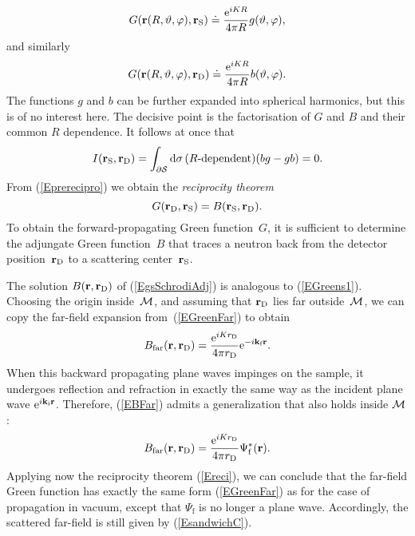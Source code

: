 \begin{equation}
   G(\mathbf{r}(R,\vartheta,\varphi),\mathbf{r}_\text{S})
   \doteq \frac{{\rm e}^{iKR}}{4\pi R} g(\vartheta,\varphi),
\end{equation}
and similarly 
\begin{equation}
   G(\mathbf{r}(R,\vartheta,\varphi),\mathbf{r}_\text{D})
   \doteq \frac{{\rm e}^{iKR}}{4\pi R} b(\vartheta,\varphi).
\end{equation}
The functions $g$ and $b$ can be further expanded into spherical harmonics,
but this is of no interest here.
The decisive point is the factorisation of $G$ and $B$
and their common $R$ dependence.
It follows at once that
\begin{equation}
  I(\mathbf{r}_\text{S},\mathbf{r}_\text{D})
  =\displaystyle\int_{\partial\mathcal{S}}{\rm d}\sigma\,
       (\text{$R$-dependent})(bg-gb)
  = 0.
\end{equation}
From (\ref{Eprerecipro}) we obtain the \textit{reciprocity theorem}
\begin{equation}\label{Ereci}
  G(\mathbf{r}_\text{D},\mathbf{r}_\text{S}) = B(\mathbf{r}_\text{S},\mathbf{r}_\text{D}).
\end{equation}
To obtain the forward-propagating Green function~$G$,
it is sufficient to determine the adjungate Green function~$B$
that traces a neutron back from the detector position~$\mathbf{r}_\text{D}$
to a scattering center~$\mathbf{r}_\text{S}$.

The solution $B(\mathbf{r},\mathbf{r}_\text{D})$ of (\ref{EgsSchrodiAdj})
is analogous to (\ref{EGreens1}).
Choosing the origin inside~$\mathcal{M}$, 
and assuming that $\mathbf{r}_\text{D}$ lies far outside~$\mathcal{M}$,
we can copy the far-field expansion from~(\ref{EGreenFar})
to obtain
\begin{equation}\label{EBFar}
  B_\text{far}(\mathbf{r},\mathbf{r}_\text{D})
  =\frac{{\rm e}^{iKr_\text{D}}}{4\pi r_\text{D}}{\rm e}^{-i\mathbf{k}_\text{f} \mathbf{r}}.
\end{equation}
When this backward propagating plane waves impinges on the sample,
it undergoes reflection and refraction in exactly the same way as
the incident plane wave ${\rm e}^{i\mathbf{k}_\text{i}\mathbf{r}}$.
Therefore,
 (\ref{EBFar}) admits a generalization that also holds inside $\mathcal{M}$:
\begin{equation}\label{EBFull}
  B_\text{far}(\mathbf{r},\mathbf{r}_\text{D})
  = \frac{{\rm e}^{iKr_\text{D}}}{4\pi r_\text{D}}\Psi^*_\text{f}(\mathbf{r}).
\end{equation}
Applying now the reciprocity theorem (\ref{Ereci}),
we can conclude that the far-field Green function
has exactly the same form (\ref{EGreenFar})
as for the case of propagation in vacuum,
except that $\Psi_\text{f}$ is no longer a plane wave.
Accordingly,
the scattered far-field is still given by (\ref{EsandwichC}).

